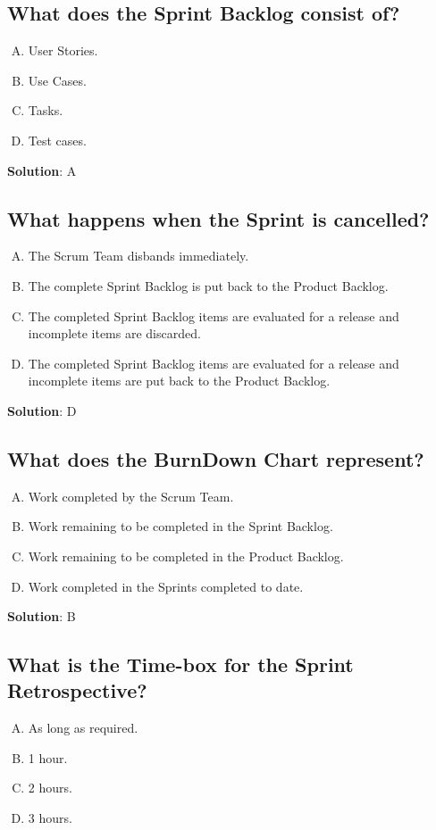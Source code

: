 \subsection{What does the Sprint Backlog consist of?}
\begin{enumerate}[A)]
  \item User Stories.
  \item Use Cases.
  \item Tasks.
  \item Test cases.
\end{enumerate}


\textbf{Solution}: A


\subsection{What happens when the Sprint is cancelled?}
\begin{enumerate}[A)]
  \item The Scrum Team disbands immediately.
  \item The complete Sprint Backlog is put back to the Product Backlog.
  \item The completed Sprint Backlog items are evaluated for a release and incomplete items are discarded.
  \item The completed Sprint Backlog items are evaluated for a release and incomplete items are put back to the Product Backlog.
\end{enumerate}


\textbf{Solution}: D


\subsection{What does the BurnDown Chart represent?}
\begin{enumerate}[A)]
  \item Work completed by the Scrum Team.
  \item Work remaining to be completed in the Sprint Backlog.
  \item Work remaining to be completed in the Product Backlog.
  \item Work completed in the Sprints completed to date.
\end{enumerate}


\textbf{Solution}: B


\subsection{What is the Time-box for the Sprint Retrospective?}
\begin{enumerate}[A)]
  \item As long as required.
  \item 1 hour.
  \item 2 hours.
  \item 3 hours.
\end{enumerate}


